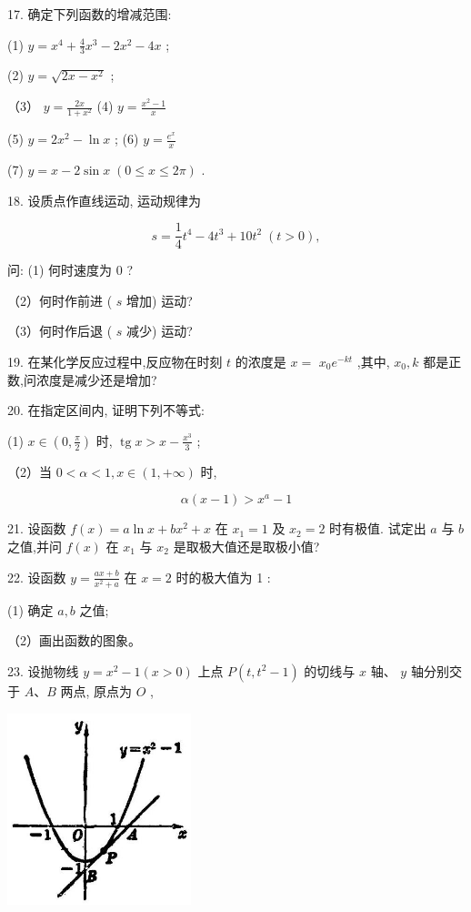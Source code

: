 \documentclass[10pt]{article}
\begin{document}
17. 确定下列函数的增减范围:

(1) \(y = {x}^{4} + \frac{4}{3}{x}^{3} - 2{x}^{2} - {4x}\) ;

(2) \(y = \sqrt{{2x} - {x}^{2}}\) ;

（3） \(y = \frac{2x}{1 + {x}^{2}}\) (4) \(y = \frac{{x}^{2} - 1}{x}\)

(5) \(y = 2{x}^{2} - \ln x\) ; (6) \(y = \frac{{e}^{x}}{x}\)

(7) \(y = x - 2\sin x\;\left( {0 \leq x \leq {2\pi }}\right)\) .

18. 设质点作直线运动, 运动规律为

\[
s = \frac{1}{4}{t}^{4} - 4{t}^{3} + {10}{t}^{2}\;\left( {t > 0}\right) ,
\]

问: (1) 何时速度为 \(0\) ?

（2）何时作前进 ( \(s\) 增加) 运动?

（3）何时作后退 ( \(s\) 减少) 运动?

19. 在某化学反应过程中,反应物在时刻 \(t\) 的浓度是 \(x =\) \({x}_{0}{e}^{-{kt}}\) ,其中, \({x}_{0},k\) 都是正数,问浓度是减少还是增加?

20. 在指定区间内, 证明下列不等式:

(1) \(x \in \left( {0,\frac{\pi }{2}}\right)\) 时, \(\operatorname{tg}x > x - \frac{{x}^{3}}{3}\) ;

（2）当 \(0 < \alpha < 1,x \in \left( {1, + \infty }\right)\) 时,

\[
\alpha \left( {x - 1}\right) > {x}^{a} - 1
\]

21. 设函数 \(f\left( x\right) = a\ln x + b{x}^{2} + x\) 在 \({x}_{1} = 1\) 及 \({x}_{2} = 2\) 时有极值. 试定出 \(a\) 与 \(b\) 之值,并问 \(f\left( x\right)\) 在 \({x}_{1}\) 与 \({x}_{2}\) 是取极大值还是取极小值?

22. 设函数 \(y = \frac{{ax} + b}{{x}^{2} + a}\) 在 \(x = 2\) 时的极大值为 1 :

(1) 确定 \(a,b\) 之值;

（2）画出函数的图象。

23. 设抛物线 \(y = {x}^{2} - 1\left( {x > 0}\right)\) 上点 \(P\left( {t,{t}^{2} - 1}\right)\) 的切线与 \(x\) 轴、 \(y\) 轴分别交于 \(A\text{、}B\) 两点, 原点为 \(O\) ,

\begin{center}
\includegraphics[max width=0.4\textwidth]{images/01912c18-5c3f-733d-b775-749ba9897a9d_182_738738.jpg}
\end{center}
\end{document}
